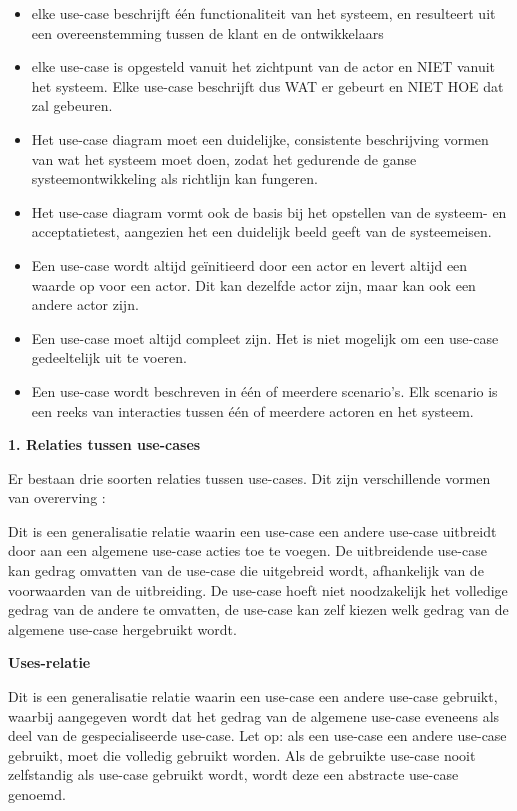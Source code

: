 \begin{itemize}
    \item elke use-case beschrijft één functionaliteit van het systeem, en resulteert uit een overeenstemming tussen de klant en de ontwikkelaars
    \item elke use-case is opgesteld vanuit het zichtpunt van de actor en NIET vanuit het systeem. Elke use-case beschrijft dus WAT er gebeurt en NIET HOE dat zal gebeuren.
    \item Het use-case diagram moet een duidelijke, consistente beschrijving vormen van wat het systeem moet doen, zodat het gedurende de ganse systeemontwikkeling als richtlijn kan fungeren.
    \item Het use-case diagram vormt ook de basis bij het opstellen van de systeem- en acceptatietest, aangezien het een duidelijk beeld geeft van de systeemeisen.
    \item Een use-case wordt altijd geïnitieerd door een actor en levert altijd een waarde op voor een actor. Dit kan dezelfde actor zijn, maar kan ook een andere actor zijn.
    \item Een use-case moet altijd compleet zijn. Het is niet mogelijk om een use-case gedeeltelijk uit te voeren. 
    \item Een use-case wordt beschreven in één of meerdere scenario's. Elk scenario is een reeks van interacties tussen één of meerdere actoren en het systeem.
\end{itemize}

\textbf{1. Relaties tussen use-cases}

Er bestaan drie soorten relaties tussen use-cases. Dit zijn verschillende vormen van overerving :


Dit is een generalisatie relatie waarin een use-case een andere use-case uitbreidt door aan een algemene use-case acties toe te voegen. De uitbreidende use-case kan gedrag omvatten van de use-case die uitgebreid wordt, afhankelijk van de voorwaarden van de uitbreiding. De use-case hoeft niet noodzakelijk het volledige gedrag van de andere te omvatten, de use-case kan zelf kiezen welk gedrag van de algemene use-case hergebruikt wordt.


\textbf{Uses-relatie}

Dit is een generalisatie relatie waarin een use-case een andere use-case gebruikt, waarbij aangegeven wordt dat het gedrag van de algemene use-case eveneens als deel van de gespecialiseerde use-case. Let op: als een use-case een andere use-case gebruikt, moet die volledig gebruikt worden. Als de gebruikte use-case nooit zelfstandig als use-case gebruikt wordt, wordt deze een abstracte use-case genoemd.


